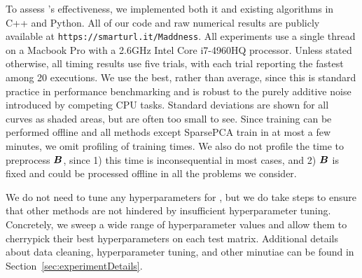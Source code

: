 
To assess \ours's effectiveness, we implemented both it and existing algorithms in C++ and Python. All of our code and raw numerical results are publicly available at \texttt{https://smarturl.it/Maddness}. All experiments use a single thread on a Macbook Pro with a 2.6GHz Intel Core i7-4960HQ processor. Unless stated otherwise, all timing results use five trials, with each trial reporting the fastest among 20 executions. We use the best, rather than average, since this is standard practice in performance benchmarking and is robust to the purely additive noise introduced by competing CPU tasks. Standard deviations are shown for all curves as shaded areas, but are often too small to see. Since training can be performed offline and all methods except SparsePCA \cite{sparsePCA} train in at most a few minutes, we omit profiling of training times. We also do not profile the time to preprocess $\bm{B}$, since 1) this time is inconsequential in most cases, and 2) $\bm{B}$ is fixed and could be processed offline in all the problems we consider.



We do not need to tune any hyperparameters for \ours, but we do take steps to ensure that other methods are not hindered by insufficient hyperparameter tuning. Concretely, we sweep a wide range of hyperparameter values and allow them to cherrypick their best hyperparameters on each test matrix.
Additional details about data cleaning, hyperparameter tuning, and other minutiae can be found in Section~\ref{sec:experimentDetails}.

